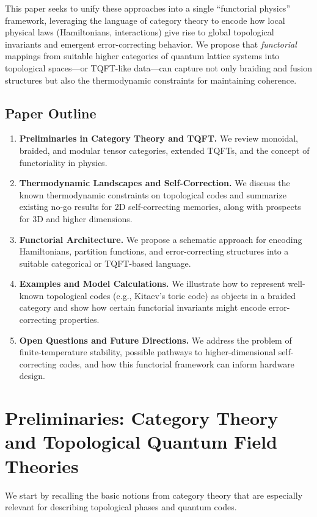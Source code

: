 \documentclass[12pt]{article}
\begin{document}
This paper seeks to unify these approaches into a single “functorial physics” framework, leveraging the language of category theory to encode how local physical laws (Hamiltonians, interactions) give rise to global topological invariants and emergent error-correcting behavior. We propose that \emph{functorial} mappings from suitable higher categories of quantum lattice systems into topological spaces---or TQFT-like data---can capture not only braiding and fusion structures but also the thermodynamic constraints for maintaining coherence.

\subsection{Paper Outline}
\begin{enumerate}
    \item \textbf{Preliminaries in Category Theory and TQFT.} We review monoidal, braided, and modular tensor categories, extended TQFTs, and the concept of functoriality in physics.
    \item \textbf{Thermodynamic Landscapes and Self-Correction.} We discuss the known thermodynamic constraints on topological codes and summarize existing no-go results for 2D self-correcting memories, along with prospects for 3D and higher dimensions.
    \item \textbf{Functorial Architecture.} We propose a schematic approach for encoding Hamiltonians, partition functions, and error-correcting structures into a suitable categorical or TQFT-based language.
    \item \textbf{Examples and Model Calculations.} We illustrate how to represent well-known topological codes (e.g., Kitaev’s toric code) as objects in a braided category and show how certain functorial invariants might encode error-correcting properties.
    \item \textbf{Open Questions and Future Directions.} We address the problem of finite-temperature stability, possible pathways to higher-dimensional self-correcting codes, and how this functorial framework can inform hardware design.
\end{enumerate}

\section{Preliminaries: Category Theory and Topological Quantum Field Theories}
We start by recalling the basic notions from category theory that are especially relevant for describing topological phases and quantum codes.
\end{document}
